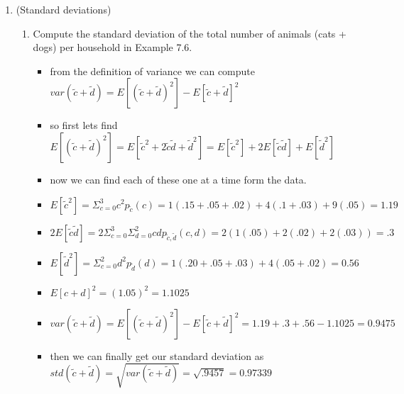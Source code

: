 \documentclass[12pt,twoside]{article}
\begin{document}
\begin{enumerate}
\begin{itemize}
    \item first we want to show that b=h(a) $\forall b\in B$. this holds direclty from the defention. 
    \item next we want to show that for the values of a that map to some value of b $P_{\tilde{b}}(b)=P_{\tilde{a}}h(a)$
    \begin{itemize}
        \item note that we can expres $P_{\tilde{b}}(b)=P_{h(\tilde{a})}(h(a))$ for some subset of $a\in A$ as we understand h is deterministic, and P is a valid probability funciton 
        \item we can see that $P_{\tilde{b}}(b)=P_{h(\tilde{a})}(h(a))=P_{\tilde{a}}P(a)$
    \end{itemize}
    \item thus we can see that for any $b\in B$ there exists a $a\in A$ such that $aP_{\tilde{a}}(a)=bP_{\tilde{b}}(b)$
    \item furhter we know that $h:A\rightarrow B$ thus H will map all values in A to B, and there will always be some value in A which maps to all values in A 
    \item thus we can see that $\E(\rnd{b}) & := \sum_{b \in B} b \, p_{\rb}(b) \\
 = \sum_{a \in A} h(a) p_{\rnd{a}} (a).$ will hold
 
\end{itemize}


\item (Standard deviations) 
\begin{enumerate}
\item Compute the standard deviation of the total number of animals (cats + dogs) per household in Example 7.6.
\begin{itemize}
    \item from the definition of variance we can compute $var(\tilde{c}+\tilde{d})=E[(\tilde{c}+\tilde{d})^2]-E[\tilde{c}+\tilde{d}]^2$ 
    \item so first lets find $E[(\tilde{c}+\tilde{d})^2]=E[\tilde{c}^2+2\tilde{c}\tilde{d}+\tilde{d}^2]=E[\tilde{c}^2]+2E[\tilde{c}\tilde{d}]+E[\tilde{d}^2]$ 
    \item now we can find each of these one at a time form the data. 
    \item $E[\tilde{c}^2]=\Sigma_{c=0}^{3}c^2p_{\tilde{c}}(c)=1(.15+.05+.02)+4(.1+.03)+9(.05)=1.19$
    \item$2E[\tilde{c}\tilde{d}]=2\Sigma_{c=0}^{3}\Sigma_{d=0}^{2}cdp_{\tilde{c},\tilde{d}}(c,d)=2(1(.05)+2(.02)+2(.03))=.3$
    \item $E[\tilde{d}^2]=\Sigma_{c=0}^{2}d^2p_{\tilde{d}}(d)=1(.20+.05+.03)+4(.05+.02)=0.56$
    \item $E[c+d]^2=(1.05)^2=1.1025$
    \item $var(\tilde{c}+\tilde{d})=E[(\tilde{c}+\tilde{d})^2]-E[\tilde{c}+\tilde{d}]^2=1.19+.3+.56-1.1025=0.9475$
    \item then we can finally get our standard deviation as $std(\tilde{c}+\tilde{d})=\sqrt{var(\tilde{c}+\tilde{d})}=\sqrt{.9457}=0.97339$
    

\end{itemize}
\end{enumerate}
\end{enumerate}
\end{document}
